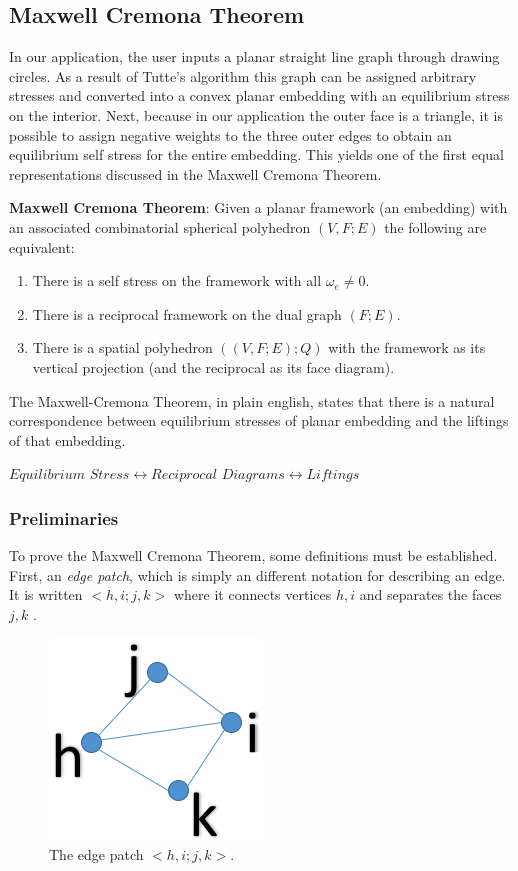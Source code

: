 \documentclass[11pt]{article}
\begin{document}
\subsection{Maxwell Cremona Theorem}
In our application, the user inputs a planar straight line graph through drawing circles. As a result of Tutte's algorithm this graph can be assigned arbitrary stresses and converted into a convex planar embedding with an equilibrium stress on the interior. Next, because in our application the outer face is a triangle, it is possible to assign negative weights to the three outer edges to obtain an equilibrium self stress for the entire embedding. This yields one of the first equal representations discussed in the Maxwell Cremona Theorem.

\textbf{Maxwell Cremona Theorem}: Given a planar framework (an embedding) with an associated combinatorial spherical polyhedron $(V,F;E)$ the following are equivalent:
\begin{enumerate}
	\item There is a self stress on the framework with all $\omega_e \neq 0$.
	\item There is a reciprocal framework on the dual graph $(F;E)$.
	\item There is a spatial polyhedron $((V,F;E);Q)$ with the framework as its vertical projection (and the reciprocal as its face diagram).
 \end{enumerate}
 
 The Maxwell-Cremona Theorem, in plain english, states that there is a natural correspondence between equilibrium stresses of planar embedding and the liftings of that embedding.
 
 $Equilibrium$  $Stress \leftrightarrow Reciprocal$ $Diagrams \leftrightarrow Liftings$
 
\subsubsection{Preliminaries}
To prove the Maxwell Cremona Theorem, some definitions must be established. First, an \emph{edge patch}, which is simply an different notation for describing an edge. It is written $<h,i;j,k>$ where it connects vertices $h,i$ and separates the faces $j,k$ \cite{mccProof}.

\begin{figure}
  \begin{center}
  		\includegraphics[width=.23\textwidth]{edge_patch2}
  \end{center}
  \caption{The edge patch $<h,i;j,k>$.}
\end{figure}
  
\end{document}

